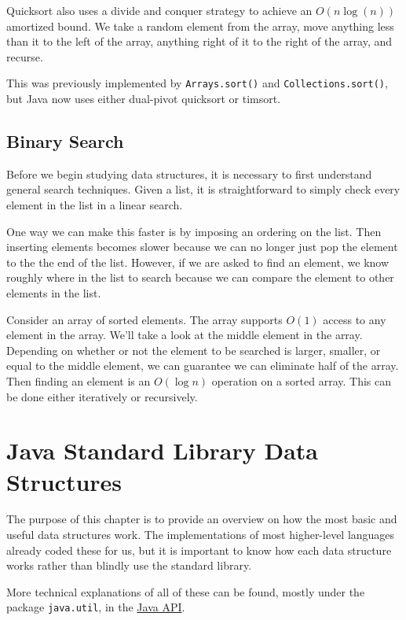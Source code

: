 \documentclass[11pt]{book}
\begin{document}
Quicksort also uses a divide and conquer strategy to achieve an $O(n \log (n))$ amortized bound. We take a random element from the array, move anything less than it to the left of the array, anything right of it to the right of the array, and recurse.

This was previously implemented by \texttt{Arrays.sort()} and \texttt{Collections.sort()}, but Java now uses either dual-pivot quicksort or timsort.

\section{Binary Search}

Before we begin studying data structures, it is necessary to first understand general search techniques. Given a list, it is straightforward to simply check every element in the list in a linear search.

One way we can make this faster is by imposing an ordering on the list. Then inserting elements becomes slower because we can no longer just pop the element to the the end of the list. However, if we are asked to find an element, we know roughly where in the list to search because we can compare the element to other elements in the list.

Consider an array of sorted elements. The array supports $O(1)$ access to any element in the array. We'll take a look at the middle element in the array. Depending on whether or not the element to be searched is larger, smaller, or equal to the middle element, we can guarantee we can eliminate half of the array. Then finding an element is an $O(\log{n})$ operation on a sorted array. This can be done either iteratively or recursively.

\chapter{Java Standard Library Data Structures}

The purpose of this chapter is to provide an overview on how the most basic and useful data structures work. The implementations of most higher-level languages already coded these for us, but it is important to know how each data structure works rather than blindly use the standard library.

More technical explanations of all of these can be found, mostly under the package \texttt{java.util}, in the \href{https://docs.oracle.com/javase/8/docs/api/}{Java API}.
\end{document}
